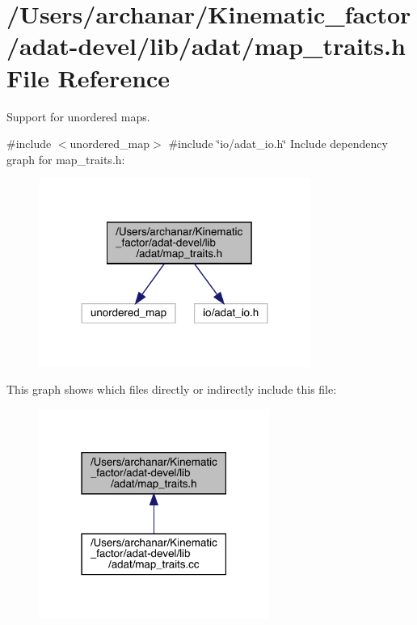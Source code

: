 \hypertarget{adat-devel_2lib_2adat_2map__traits_8h}{}\section{/\+Users/archanar/\+Kinematic\+\_\+factor/adat-\/devel/lib/adat/map\+\_\+traits.h File Reference}
\label{adat-devel_2lib_2adat_2map__traits_8h}


Support for unordered maps.  


{\ttfamily \#include $<$unordered\+\_\+map$>$}\newline
{\ttfamily \#include \char`\"{}io/adat\+\_\+io.\+h\char`\"{}}\newline
Include dependency graph for map\+\_\+traits.\+h\+:
\nopagebreak
\begin{figure}[H]
\begin{center}
\leavevmode
\includegraphics[width=252pt]{d5/d30/adat-devel_2lib_2adat_2map__traits_8h__incl}
\end{center}
\end{figure}
This graph shows which files directly or indirectly include this file\+:
\nopagebreak
\begin{figure}[H]
\begin{center}
\leavevmode
\includegraphics[width=214pt]{df/dc5/adat-devel_2lib_2adat_2map__traits_8h__dep__incl}
\end{center}
\end{figure}
